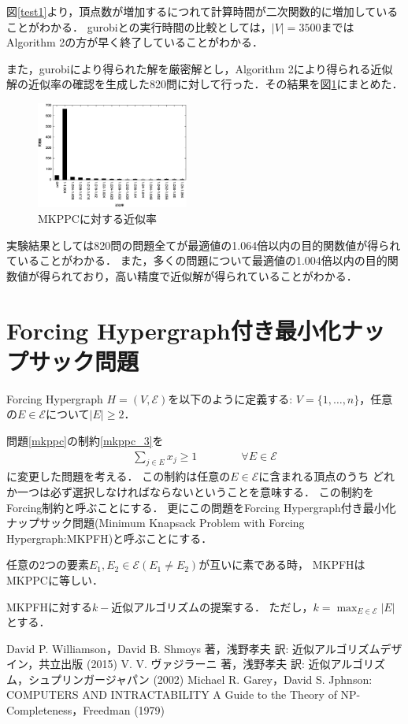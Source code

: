 \documentclass[twocolumn,10pt,dvipdfmx]{jarticle}
\numberwithin{equation}{section}
\begin{document}
	図\ref{test1}より，頂点数が増加するにつれて計算時間が二次関数的に増加していることがわかる．
	gurobiとの実行時間の比較としては，$|V|=3500$まではAlgorithm 2の方が早く終了していることがわかる．\par
	また，gurobiにより得られた解を厳密解とし，Algorithm 2により得られる近似解の近似率の確認を生成した820問に対して行った．その結果を図\ref{apx1}にまとめた．\par
	\begin{figure}[htbp]
		\begin{center}
			\includegraphics[width=50mm]{apx1.eps}
		\end{center}
		\caption{MKPPCに対する近似率}
		\label{apx1}
	\end{figure}
	実験結果としては820問の問題全てが最適値の1.064倍以内の目的関数値が得られていることがわかる．
	また，多くの問題について最適値の1.004倍以内の目的関数値が得られており，高い精度で近似解が得られていることがわかる．
\section{Forcing Hypergraph付き最小化ナップサック問題}
	Forcing Hypergraph $H=(V,\mathcal{E})$を以下のように定義する: $V=\{1, \dotsc, n \}$，任意の$E\in\mathcal{E}$について$|E|\ge2$．\par
	問題\eqref{mkppc}の制約\eqref{mkppc_3}を
	\begin{align}
		\sum_{j\in E}{x_j}\ge 1 \qquad\qquad \forall E\in \mathcal{E}
	\end{align}
	に変更した問題を考える．
	この制約は任意の$E\in\mathcal{E}$に含まれる頂点のうち
	どれか一つは必ず選択しなければならないということを意味する．
	この制約をForcing制約と呼ぶことにする．
	更にこの問題をForcing Hypergraph付き最小化ナップサック問題(Minimum Knapsack Problem with Forcing Hypergraph:MKPFH)と呼ぶことにする．\par
	任意の2つの要素$E_1,E_2\in\mathcal{E}(E_1\neq E_2)$が互いに素である時，
	MKPFHはMKPPCに等しい．\par
	MKPFHに対する$k-$近似アルゴリズムの提案する．
	ただし，$k=\displaystyle\max_{E\in \mathcal{E}}|E|$とする．

\begin{thebibliography}{99}
		David P. Williamson，David B. Shmoys 著，浅野孝夫 訳: 近似アルゴリズムデザイン，共立出版 (2015)
		V. V. ヴァジラーニ 著，浅野孝夫 訳: 近似アルゴリズム，シュプリンガージャパン (2002)
		Michael R. Garey，David S. Jphnson: COMPUTERS AND INTRACTABILITY A Guide to the Theory of NP-Completeness，Freedman (1979)
\end{thebibliography}
\end{document}
